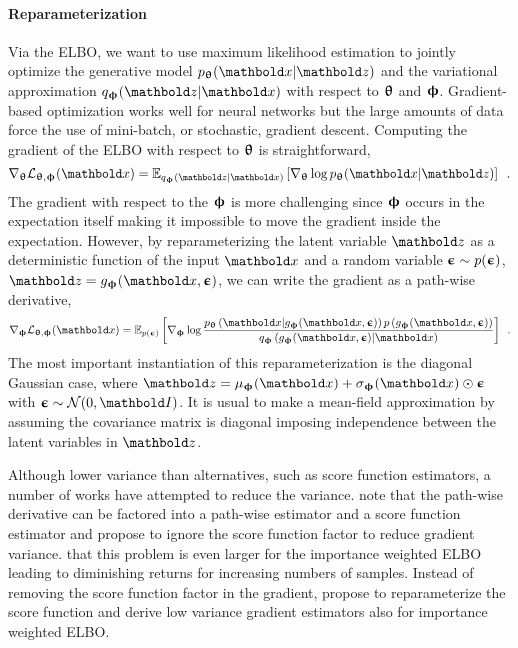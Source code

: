 \paragraph{Reparameterization} 
Via the ELBO, we want to use maximum likelihood estimation to jointly optimize the generative model $p_\thetab(\xb|\zb)$ and the variational approximation $q_\phib(\zb|\xb)$ with respect to ${\boldsymbol{\uptheta}}$ and ${\boldsymbol{\upphi}}$. 
Gradient-based optimization works well for neural networks but the large amounts of data force the use of mini-batch, or stochastic, gradient descent. 
Computing the gradient of the ELBO with respect to ${\boldsymbol{\uptheta}}$ is straightforward,
%
\begin{equation}
    \nabla_\thetab \mathcal{L}_{\thetab,\phib}(\xb)
    = \mathbb{E}_{q_\phib(\zb|\xb)} \left[ \nabla_\thetab \log p_\thetab(\xb|\zb) \right] \enspace .
\end{equation}
%
The gradient with respect to the ${\boldsymbol{\upphi}}$ is more challenging since ${\boldsymbol{\upphi}}$ occurs in the expectation itself making it impossible to move the gradient inside the expectation. 
However, by reparameterizing the latent variable $\zb$ as a deterministic function of the input $\xb$ and a random variable ${\boldsymbol{\upepsilon}}\sim p({\boldsymbol{\upepsilon}})$, $\zb = g_\phib(\xb,\epsilonb)$, we can write the gradient as a path-wise derivative,
%
\begin{equation}
    \nabla_\phib \mathcal{L}_{\thetab,\phib}(\xb)
    = \mathbb{E}_{p(\epsilonb)} \left[ \nabla_\phib \log \frac{p_\thetab\left(\xb|g_\phib(\xb,\epsilonb)\right)p\left(g_\phib(\xb,\epsilonb)\right)}{q_\phib\left(g_\phib(\xb,\epsilonb)|\xb\right)} \right] \enspace . \\
\end{equation}
%
The most important instantiation of this reparameterization is the diagonal Gaussian case, where $\zb = \mu_\phib(\xb) + \sigma_\phib(\xb) \odot \epsilonb$ with $\epsilonb\sim\mathcal{N}(0,\mathbf{I})$. It is usual to make a mean-field approximation by assuming the covariance matrix is diagonal imposing independence between the latent variables in $\zb$. 

Although lower variance than alternatives, such as score function estimators, a number of works have attempted to reduce the variance. 
\textcite{roeder_sticking_2017} note that the path-wise derivative can be factored into a path-wise estimator and a score function estimator and propose to ignore the score function factor to reduce gradient variance. 
\textcite{rainforth_tighter_2019} that this problem is even larger for the importance weighted ELBO \cite{burda_importance_2016} leading to diminishing returns for increasing numbers of samples. Instead of removing the score function factor in the gradient, \textcite{tucker_doubly_2019} propose to reparameterize the score function and derive low variance gradient estimators also for importance weighted ELBO.


